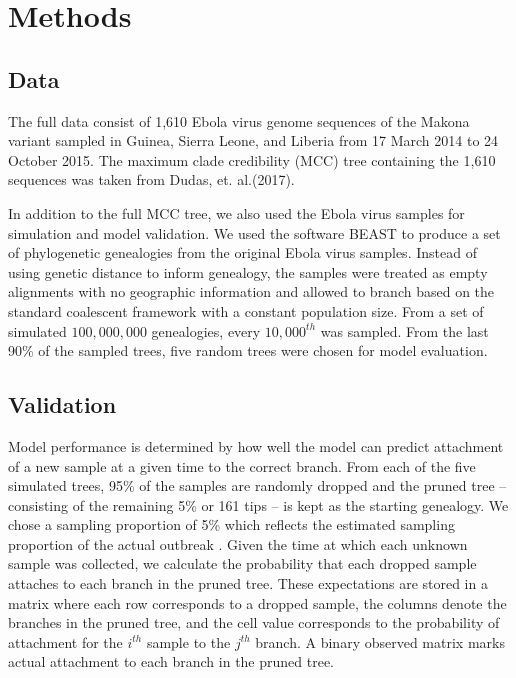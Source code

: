 \documentclass[11pt,oneside,letterpaper]{article}
\newcommand\tab[1][1cm]{\hspace*{#1}}
\begin{document}
\section*{Methods}

\subsection*{Data}
\tab The full data consist of 1,610 Ebola virus genome sequences of the Makona variant sampled in Guinea, Sierra Leone, and Liberia from 17 March 2014 to 24 October 2015. The maximum clade credibility (MCC) tree containing the 1,610 sequences was taken from Dudas, et. al.(2017)\cite{dudas2017virus}. 

\tab In addition to the full MCC tree, we also used the Ebola virus samples for simulation and model validation. We used the software BEAST \cite{drummond2007beast} to produce a set of phylogenetic genealogies from the original Ebola virus samples. Instead of using genetic distance to inform genealogy, the samples were treated as empty alignments with no geographic information and allowed to branch based on the standard coalescent framework with a constant population size. From a set of simulated $100,000,000$ genealogies, every $10,000^{th}$ was sampled. From the last 90\% of the sampled trees, five random trees were chosen for model evaluation.

\subsection*{Validation}
\tab Model performance is determined by how well the model can predict attachment of a new sample at a given time to the correct branch. From each of the five simulated trees, 95\% of the samples are randomly dropped and the pruned tree -- consisting of the remaining 5\% or 161 tips -- is kept as the starting genealogy. We chose a sampling proportion of 5\% which reflects the estimated sampling proportion of the actual outbreak \cite{world2016ebola}. Given the time at which each unknown sample was collected, we calculate the probability that each dropped sample attaches to each branch in the pruned tree. These expectations are stored in a matrix where each row corresponds to a dropped sample, the columns denote the branches in the pruned tree, and the cell value corresponds to the probability of attachment for the $i^{th}$ sample to the $j^{th}$ branch. A binary observed matrix marks actual attachment to each branch in the pruned tree. 
\end{document}
